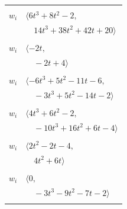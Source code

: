 \documentclass[11pt]{article}
\begin{document}
\begin{longtable}{@{}ll@{}}
\addlinespace[2pt]
\multicolumn{2}{@{}p{0.97\textwidth}@{}}{$i=30$, $D_i=1$, $\rho_{ij}$: $0{:}2, \allowbreak 2{:}1, \allowbreak 3{:}1, \allowbreak 11{:}1, \allowbreak 21{:}2, \allowbreak 22{:}1, \allowbreak 31{:}1, \allowbreak 34{:}2, \allowbreak 35{:}2$}\\
$w_i$ & $\langle 6t^{3}+8t^{2}-2,$\\
 & $\quad 14t^{3}+38t^{2}+42t+20\rangle$\\
\addlinespace[2pt]
\multicolumn{2}{@{}p{0.97\textwidth}@{}}{$i=31$, $D_i=1$, $\rho_{ij}$: $4{:}2, \allowbreak 30{:}2, \allowbreak 32{:}1$}\\
$w_i$ & $\langle -2t,$\\
 & $\quad -2t+4\rangle$\\
\addlinespace[2pt]
\multicolumn{2}{@{}p{0.97\textwidth}@{}}{$i=32$, $D_i=1$, $\rho_{ij}$: $2{:}2, \allowbreak 5{:}2, \allowbreak 8{:}2, \allowbreak 21{:}1, \allowbreak 27{:}1, \allowbreak 31{:}2, \allowbreak 33{:}2$}\\
$w_i$ & $\langle -6t^{3}+5t^{2}-11t-6,$\\
 & $\quad -3t^{3}+5t^{2}-14t-2\rangle$\\
\addlinespace[2pt]
\multicolumn{2}{@{}p{0.97\textwidth}@{}}{$i=33$, $D_i=1$, $\rho_{ij}$: $1{:}2, \allowbreak 2{:}1, \allowbreak 7{:}2, \allowbreak 9{:}1, \allowbreak 15{:}2, \allowbreak 16{:}2, \allowbreak 19{:}2, \allowbreak 21{:}1, \allowbreak 25{:}2, \allowbreak 32{:}1$}\\
$w_i$ & $\langle 4t^{3}+6t^{2}-2,$\\
 & $\quad -10t^{3}+16t^{2}+6t-4\rangle$\\
\addlinespace[2pt]
\multicolumn{2}{@{}p{0.97\textwidth}@{}}{$i=34$, $D_i=1$, $\rho_{ij}$: $2{:}2, \allowbreak 3{:}2, \allowbreak 7{:}1, \allowbreak 8{:}2, \allowbreak 11{:}2, \allowbreak 30{:}1$}\\
$w_i$ & $\langle 2t^{2}-2t-4,$\\
 & $\quad 4t^{2}+6t\rangle$\\
\addlinespace[2pt]
\multicolumn{2}{@{}p{0.97\textwidth}@{}}{$i=35$, $D_i=2$, $\rho_{ij}$: $1{:}2, \allowbreak 12{:}2, \allowbreak 26{:}2, \allowbreak 29{:}1, \allowbreak 30{:}1$}\\
$w_i$ & $\langle 0,$\\
 & $\quad -3t^{3}-9t^{2}-7t-2\rangle$\\
\addlinespace[2pt]
\end{longtable}
\endgroup
\end{document}
